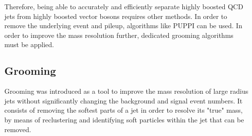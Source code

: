 Therefore, being able to accurately and efficiently separate highly boosted QCD jets from highly boosted vector bosons requires other methods. In order to remove the underlying event and pileup, algorithms like PUPPI can be used. In order to improve the mass resolution further, dedicated grooming algorithms must be applied.

\subsection{Grooming}
\label{sec:objreco:grooming}
Grooming was introduced as a tool to improve the mass resolution of large radius jets without significantly changing the background and signal event numbers. It consists of removing the softest parts of a jet in order to resolve its "true" mass, by means of reclustering and identifying soft particles within the jet that can be removed.

